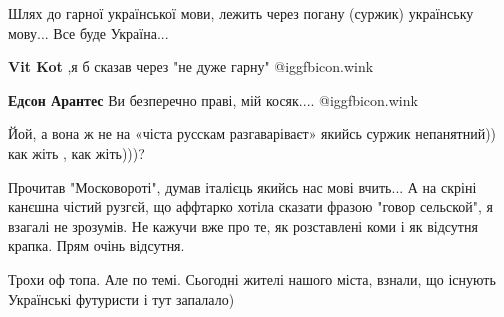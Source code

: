 \begin{itemize}
{Шлях до гарної української мови, лежить через погану (суржик) українську
мову... Все буде Україна...

\begin{itemize}{
 
\textbf{Vit Kot} ,я б сказав через "не дуже гарну"  @igg{fbicon.wink} 

 
\textbf{Едсон Арантес} Ви безперечно праві, мій косяк....  @igg{fbicon.wink} 

}\end{itemize}

 
Йой, а вона ж не на «чіста русскам разгаваріваєт» якийсь суржик непанятний)) как жіть , как жіть)))?

 

Прочитав "Московороті", думав італієць якийсь нас мові вчить... А на скріні
канєшна чістий рузгєй, що аффтарко хотіла сказати фразою "говор сельской", я
взагалі не зрозумів. Не кажучи вже про те, як розставлені коми і як відсутня
крапка. Прям очінь відсутня.


 
Трохи оф топа.
Але по темі.
Сьогодні жителі нашого міста, взнали, що існують Українські футуристи і тут запалало)

}
\end{itemize}
